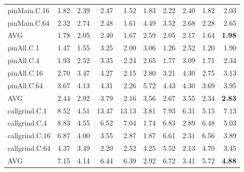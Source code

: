 \begin{table*}[]
\begin{center}
\begin{tabular}{|l|rrrrrrrr|r|}
 pinMain.C.16   & 1.82 & 2.39 &  2.47 &  1.52 & 1.83 & 2.22 & 2.40 & 1.82 & 2.03 \\
 pinMain.C.64   & 2.32 & 2.74 &  2.48 &  1.61 & 4.49 & 3.52 & 2.68 & 2.28 & 2.65 \\
 \hline
 AVG            & 1.78 & 2.05 &  2.40 &  1.67 & 2.59 & 2.05 & 2.17 & 1.64 & \textbf{1.98} \\
 \hline
 pinAll.C.1     & 1.47 & 1.55 &  3.25 &  2.00 & 3.06 & 1.26 & 2.52 & 1.20 & 1.90 \\
 pinAll.C.4     & 1.93 & 2.52 &  3.35 &  2.24 & 2.65 & 1.77 & 3.09 & 1.71 & 2.34 \\
 pinAll.C.16    & 2.70 & 3.47 &  4.27 &  2.15 & 2.80 & 3.21 & 4.30 & 2.75 & 3.13 \\
 pinAll.C.64    & 3.67 & 4.13 &  4.31 &  2.26 & 5.72 & 4.43 & 4.30 & 3.69 & 3.95 \\
 \hline
 AVG            & 2.44 & 2.92 &  3.79 &  2.16 & 3.56 & 2.67 & 3.55 & 2.34 & \textbf{2.83} \\
 \hline
 callgrind.C.1  & 8.52 & 4.51 & 13.47 & 13.13 & 3.81 & 7.93 & 6.31 & 5.15 & 7.13 \\
 callgrind.C.4  & 8.83 & 4.55 &  6.52 &  7.04 & 1.74 & 6.83 & 2.89 & 6.48 & 5.03 \\
 callgrind.C.16 & 6.87 & 4.00 &  3.55 &  2.87 & 1.87 & 6.61 & 2.31 & 6.56 & 3.89 \\
 callgrind.C.64 & 4.37 & 3.49 &  2.20 &  2.52 & 4.25 & 5.52 & 2.13 & 4.70 & 3.45 \\
 \hline
 AVG            & 7.15 & 4.14 &  6.44 &  6.39 & 2.92 & 6.72 & 3.41 & 5.72 & \textbf{4.88} \\
\hline
\end{tabular}
\end{center}
\end{table*}
